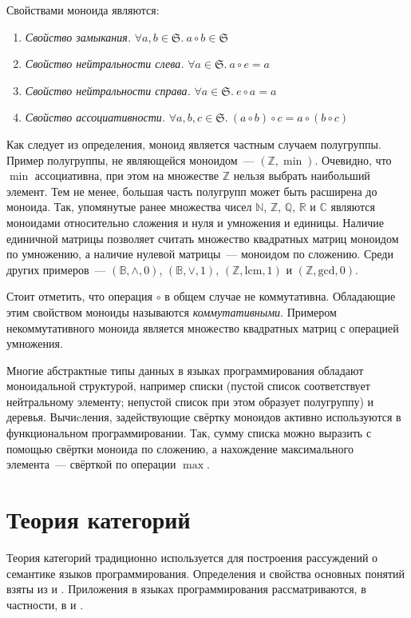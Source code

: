 Свойствами моноида являются:
\begin{enumerate}
 \item \emph{Свойство замыкания.} $\forall a, b \in \mathfrak{S}.~ a \circ b \in \mathfrak{S}$
 \item \emph{Свойство нейтральности слева.} $\forall a \in \mathfrak{S}.~ a \circ e = a$
 \item \emph{Свойство нейтральности справа.} $\forall a \in \mathfrak{S}.~ e \circ a = a$
 \item \emph{Свойство ассоциативности.} $\forall a, b, c \in \mathfrak{S}.~ (a \circ b) \circ c = a \circ (b \circ c)$
\end{enumerate}

Как следует из определения, моноид является частным случаем полугруппы. Пример полугруппы, не являющейся моноидом~--- $(\mathbb{Z}, \min)$. Очевидно, что $\min$ ассоциативна, при этом на множестве $\mathbb{Z}$ нельзя выбрать наибольший элемент. Тем не менее, большая часть полугрупп может быть расширена до моноида. Так, упомянутые ранее множества чисел $\mathbb{N}$, $\mathbb{Z}$, $\mathbb{Q}$, $\mathbb{R}$ и $\mathbb{C}$ являются моноидами относительно сложения и нуля и умножения и единицы. Наличие единичной матрицы позволяет считать множество квадратных матриц моноидом по умножению, а наличие нулевой матрицы~--- моноидом по сложению. Среди других примеров~--- $(\mathbb{B}, \wedge, 0)$, $(\mathbb{B}, \vee, 1)$, $(\mathbb{Z}, \mathrm{lcm}, 1)$ и $(\mathbb{Z}, \mathrm{gcd}, 0)$.

Стоит отметить, что операция $\circ$ в общем случае не коммутативна. Обладающие этим свойством моноиды называются \emph{коммутативными}. Примером некоммутативного моноида является множество квадратных матриц с операцией умножения.

Многие абстрактные типы данных в языках программирования обладают моноидальной структурой, например списки (пустой список соответствует нейтральному элементу; непустой список при этом образует полугруппу) и деревья. Вычиcления, задействующие свёртку моноидов активно используются в функциональном программировании\cite{piponi2009haskell}. Так, сумму списка можно выразить с помощью свёртки моноида по сложению, а нахождение максимального элемента~--- свёрткой по операции $\max$.

\section{Теория категорий}
Теория категорий традиционно используется для построения рассуждений о семантике языков программирования. Определения и свойства основных понятий взяты из \cite{lane1998categories} и \cite{barr1995category}. Приложения в языках программирования рассматриваются, в частности, в \cite{pierce1991basic} и \cite{mitchell1996foundations}.

